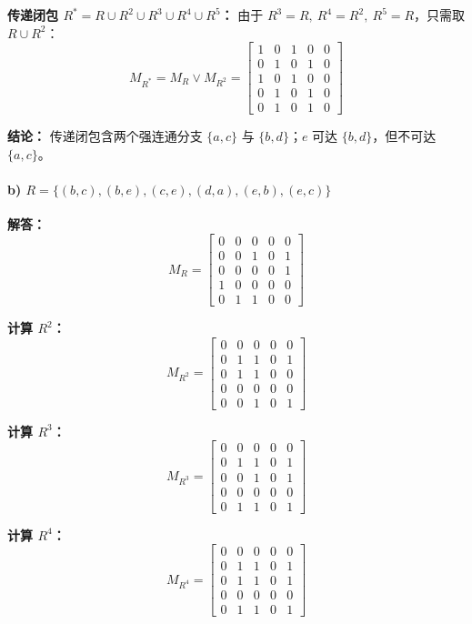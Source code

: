 \documentclass[11pt,UTF8]{article}
\begin{document}
\textbf{传递闭包 $R^* = R \cup R^2 \cup R^3 \cup R^4 \cup R^5$：}
由于 $R^3=R,\ R^4=R^2,\ R^5=R$，只需取 $R \cup R^2$：
\[
M_{R^*} = M_R \lor M_{R^2} = \begin{bmatrix}
1 & 0 & 1 & 0 & 0 \\
0 & 1 & 0 & 1 & 0 \\
1 & 0 & 1 & 0 & 0 \\
0 & 1 & 0 & 1 & 0 \\
0 & 1 & 0 & 1 & 0
\end{bmatrix}
\]

\textbf{结论：} 传递闭包含两个强连通分支 $\{a,c\}$ 与 $\{b,d\}$；$e$ 可达 $\{b,d\}$，但不可达 $\{a,c\}$。

\paragraph{b) $R = \{(b,c),(b,e),(c,e),(d,a),(e,b),(e,c)\}$}

\textbf{解答：}
\[
M_R = \begin{bmatrix}
0 & 0 & 0 & 0 & 0 \\
0 & 0 & 1 & 0 & 1 \\
0 & 0 & 0 & 0 & 1 \\
1 & 0 & 0 & 0 & 0 \\
0 & 1 & 1 & 0 & 0
\end{bmatrix}
\]

\textbf{计算 $R^2$：}
\[
M_{R^2} = \begin{bmatrix}
0 & 0 & 0 & 0 & 0 \\
0 & 1 & 1 & 0 & 1 \\
0 & 1 & 1 & 0 & 0 \\
0 & 0 & 0 & 0 & 0 \\
0 & 0 & 1 & 0 & 1
\end{bmatrix}
\]

\textbf{计算 $R^3$：}
\[
M_{R^3} = \begin{bmatrix}
0 & 0 & 0 & 0 & 0 \\
0 & 1 & 1 & 0 & 1 \\
0 & 0 & 1 & 0 & 1 \\
0 & 0 & 0 & 0 & 0 \\
0 & 1 & 1 & 0 & 1
\end{bmatrix}
\]

\textbf{计算 $R^4$：}
\[
M_{R^4} = \begin{bmatrix}
0 & 0 & 0 & 0 & 0 \\
0 & 1 & 1 & 0 & 1 \\
0 & 1 & 1 & 0 & 1 \\
0 & 0 & 0 & 0 & 0 \\
0 & 1 & 1 & 0 & 1
\end{bmatrix}
\]
\end{document}
